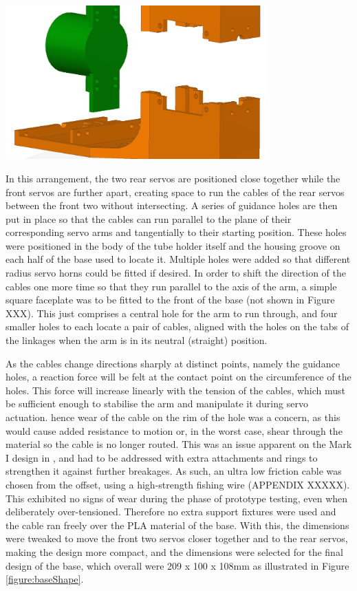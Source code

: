 \documentclass[11pt]{article}
\begin{document}
\begin{center}
\includegraphics[width=0.75\textwidth]{images/halvesConcept.png}
\label{figure:halvesConcept}
\end{center}

In this arrangement, the two rear servos are positioned close together while the front servos are further apart, creating space to run the cables of the rear servos between the front two without intersecting. A series of guidance holes are then put in place so that the cables can run parallel to the plane of their corresponding servo arms and tangentially to their starting position. These holes were positioned in the body of the tube holder itself and the housing groove on each half of the base used to locate it. Multiple holes were added so that different radius servo horns could be fitted if desired. In order to shift the direction of the cables one more time so that they run parallel to the axis of the arm, a simple square faceplate was to be fitted to the front of the base (not shown in Figure XXX). This just comprises a central hole for the arm to run through, and four smaller holes to each locate a pair of cables, aligned with the holes on the tabs of the linkages when the arm is in its neutral (straight) position.

As the cables change directions sharply at distinct points, namely the guidance holes, a reaction force will be felt at the contact point on the circumference of the holes. This force will increase linearly with the tension of the cables, which must be sufficient enough to stabilise the arm and manipulate it during servo actuation. hence wear of the cable on the rim of the hole was a concern, as this would cause added resistance to motion or, in the worst case, shear through the material so the cable is no longer routed. This was an issue apparent on the Mark I design in \cite{GreggSmithDesign}, and had to be addressed with extra attachments and rings to strengthen it against further breakages. As such, an ultra low friction cable was chosen from the offset, using a high-strength fishing wire (APPENDIX XXXXX). This exhibited no signs of wear during the phase of prototype testing, even when deliberately over-tensioned. Therefore no extra support fixtures were used and the cable ran freely over the PLA material of the base. With this, the dimensions were tweaked to move the front two servos closer together and to the rear servos, making the design more compact, and the dimensions were selected for the final design of the base, which overall were 209 x 100 x 108mm as illustrated in Figure \ref{figure:baseShape}.
\end{document}

